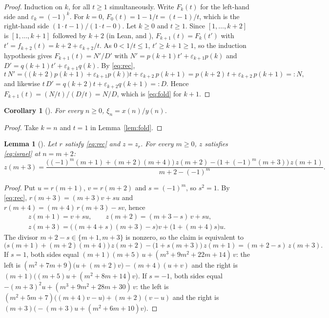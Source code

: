 \documentclass[11pt]{amsart}
\theoremstyle{plain}
\newtheorem{lemma}[theorem]{Lemma}
\newtheorem{corollary}[theorem]{Corollary}
\theoremstyle{definition}
\begin{document}
\begin{proof}
Induction on $k$, for all $t\ge1$ simultaneously. Write $F_k(t)$ for the left-hand side and $\varepsilon_k=(-1)^{k}$.
For $k=0$, $F_0(t)=1-1/t=(t-1)/t$, which is the right-hand side $(1\cdot t-1)/(1\cdot t-0)$.
Let $k\ge0$ and $t\ge1$. Since $[1,\dots,k+2]$ is $[1,\dots,k+1]$ followed by $k+2$ (in Lean,  and ), $F_{k+1}(t)=F_k(t')$ with $t'=f_{k+2}(t)=k+2+\varepsilon_{k+2}/t$.
As $0<1/t\le1$, $t'\ge k+1\ge1$, so the induction hypothesis gives $F_{k+1}(t)=N'/D'$ with $N'=p(k+1)t'+\varepsilon_{k+1}p(k)$ and $D'=q(k+1)t'+\varepsilon_{k+1}q(k)$. By \eqref{eq:rec},
\[
  t\,N'=\bigl((k+2)p(k+1)+\varepsilon_{k+1}p(k)\bigr)t+\varepsilon_{k+2}\,p(k+1)
  =p(k+2)\,t+\varepsilon_{k+2}\,p(k+1)=:N,
\]
and likewise $t\,D'=q(k+2)t+\varepsilon_{k+2}q(k+1)=:D$. Hence $F_{k+1}(t)=(N/t)/(D/t)=N/D$, which is \eqref{eq:fold} for $k+1$.
\end{proof}

\begin{corollary}[]\label{cor:cf}
For every $n\ge0$, $\xi_n=x(n)/y(n)$.
\end{corollary}

\begin{proof}
Take $k=n$ and $t=1$ in Lemma~\ref{lem:fold}.
\end{proof}

\begin{lemma}[]\label{lem:israel}
Let $r$ satisfy \eqref{eq:rec} and $z=z_r$. For every $m\ge0$, $z$ satisfies \eqref{eq:israel} at $n=m+2$:
\[
  z(m+3)=\frac{\bigl((-1)^{m}(m+1)+(m+2)(m+4)\bigr)\,z(m+2)-\bigl(1+(-1)^{m}(m+3)\bigr)\,z(m+1)}{m+2-(-1)^{m}} .
\]
\end{lemma}

\begin{proof}
Put $u=r(m+1)$, $v=r(m+2)$ and $s=(-1)^m$, so $s^2=1$. By \eqref{eq:rec}, $r(m+3)=(m+3)v+su$ and $r(m+4)=(m+4)\,r(m+3)-sv$, hence
\[
\begin{gathered}
  z(m+1)=v+su,\qquad
  z(m+2)=(m+3-s)\,v+su,\\
  z(m+3)=\bigl((m+4+s)(m+3)-s\bigr)v+\bigl(1+(m+4)s\bigr)u.
\end{gathered}
\]
The divisor $m+2-s\in\{m+1,m+3\}$ is nonzero, so the claim is equivalent to
\[
  \bigl(s(m+1)+(m+2)(m+4)\bigr)\,z(m+2)-\bigl(1+s(m+3)\bigr)\,z(m+1)=(m+2-s)\,z(m+3).
\]
If $s=1$, both sides equal $(m+1)(m+5)\,u+(m^3+9m^2+22m+14)\,v$: the left is $(m^2+7m+9)\bigl(u+(m+2)v\bigr)-(m+4)(u+v)$ and the right is $(m+1)\bigl((m+5)u+(m^2+8m+14)v\bigr)$.
If $s=-1$, both sides equal $-(m+3)^2u+(m^3+9m^2+28m+30)\,v$: the left is $(m^2+5m+7)\bigl((m+4)v-u\bigr)+(m+2)(v-u)$ and the right is $(m+3)\bigl(-(m+3)u+(m^2+6m+10)v\bigr)$.
\end{proof}
\end{document}

